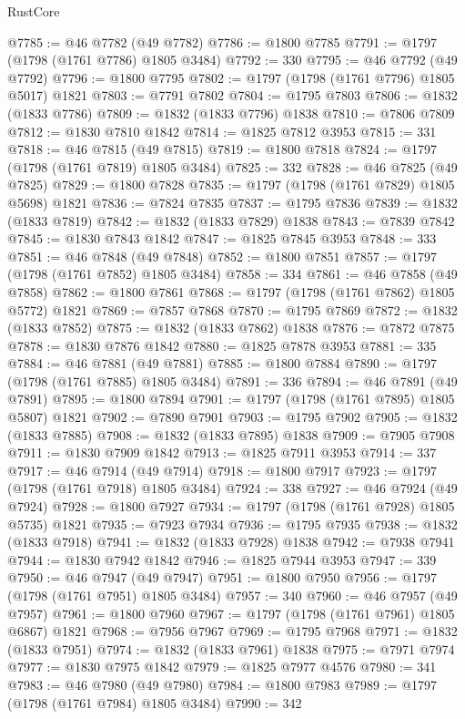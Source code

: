 \begin{lexlean}{RustCore}
\begin{coremodule}
@7785 := @46 @7782 (@49 @7782)
@7786 := @1800 @7785
@7791 := @1797 (@1798 (@1761 @7786) @1805 @3484)
@7792 := 330
@7795 := @46 @7792 (@49 @7792)
@7796 := @1800 @7795
@7802 := @1797 (@1798 (@1761 @7796) @1805 @5017) @1821
@7803 := @7791 @7802
@7804 := @1795 @7803
@7806 := @1832 (@1833 @7786)
@7809 := @1832 (@1833 @7796) @1838
@7810 := @7806 @7809
@7812 := @1830 @7810 @1842
@7814 := @1825 @7812 @3953
@7815 := 331
@7818 := @46 @7815 (@49 @7815)
@7819 := @1800 @7818
@7824 := @1797 (@1798 (@1761 @7819) @1805 @3484)
@7825 := 332
@7828 := @46 @7825 (@49 @7825)
@7829 := @1800 @7828
@7835 := @1797 (@1798 (@1761 @7829) @1805 @5698) @1821
@7836 := @7824 @7835
@7837 := @1795 @7836
@7839 := @1832 (@1833 @7819)
@7842 := @1832 (@1833 @7829) @1838
@7843 := @7839 @7842
@7845 := @1830 @7843 @1842
@7847 := @1825 @7845 @3953
@7848 := 333
@7851 := @46 @7848 (@49 @7848)
@7852 := @1800 @7851
@7857 := @1797 (@1798 (@1761 @7852) @1805 @3484)
@7858 := 334
@7861 := @46 @7858 (@49 @7858)
@7862 := @1800 @7861
@7868 := @1797 (@1798 (@1761 @7862) @1805 @5772) @1821
@7869 := @7857 @7868
@7870 := @1795 @7869
@7872 := @1832 (@1833 @7852)
@7875 := @1832 (@1833 @7862) @1838
@7876 := @7872 @7875
@7878 := @1830 @7876 @1842
@7880 := @1825 @7878 @3953
@7881 := 335
@7884 := @46 @7881 (@49 @7881)
@7885 := @1800 @7884
@7890 := @1797 (@1798 (@1761 @7885) @1805 @3484)
@7891 := 336
@7894 := @46 @7891 (@49 @7891)
@7895 := @1800 @7894
@7901 := @1797 (@1798 (@1761 @7895) @1805 @5807) @1821
@7902 := @7890 @7901
@7903 := @1795 @7902
@7905 := @1832 (@1833 @7885)
@7908 := @1832 (@1833 @7895) @1838
@7909 := @7905 @7908
@7911 := @1830 @7909 @1842
@7913 := @1825 @7911 @3953
@7914 := 337
@7917 := @46 @7914 (@49 @7914)
@7918 := @1800 @7917
@7923 := @1797 (@1798 (@1761 @7918) @1805 @3484)
@7924 := 338
@7927 := @46 @7924 (@49 @7924)
@7928 := @1800 @7927
@7934 := @1797 (@1798 (@1761 @7928) @1805 @5735) @1821
@7935 := @7923 @7934
@7936 := @1795 @7935
@7938 := @1832 (@1833 @7918)
@7941 := @1832 (@1833 @7928) @1838
@7942 := @7938 @7941
@7944 := @1830 @7942 @1842
@7946 := @1825 @7944 @3953
@7947 := 339
@7950 := @46 @7947 (@49 @7947)
@7951 := @1800 @7950
@7956 := @1797 (@1798 (@1761 @7951) @1805 @3484)
@7957 := 340
@7960 := @46 @7957 (@49 @7957)
@7961 := @1800 @7960
@7967 := @1797 (@1798 (@1761 @7961) @1805 @6867) @1821
@7968 := @7956 @7967
@7969 := @1795 @7968
@7971 := @1832 (@1833 @7951)
@7974 := @1832 (@1833 @7961) @1838
@7975 := @7971 @7974
@7977 := @1830 @7975 @1842
@7979 := @1825 @7977 @4576
@7980 := 341
@7983 := @46 @7980 (@49 @7980)
@7984 := @1800 @7983
@7989 := @1797 (@1798 (@1761 @7984) @1805 @3484)
@7990 := 342

\end{coremodule}
\end{lexlean}
